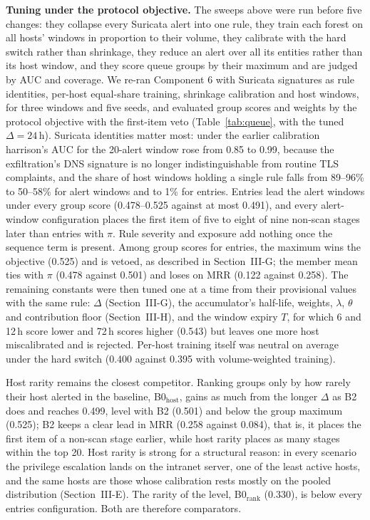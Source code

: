 \documentclass[conference]{IEEEtran}
\begin{document}
\textbf{Tuning under the protocol objective.} The sweeps above were run before five changes: they collapse every Suricata alert into one rule, they train each forest on all hosts' windows in proportion to their volume, they calibrate with the hard switch rather than shrinkage, they reduce an alert over all its entities rather than its host window, and they score queue groups by their maximum and are judged by AUC and coverage. We re-ran Component 6 with Suricata signatures as rule identities, per-host equal-share training, shrinkage calibration and host windows, for three windows and five seeds, and evaluated group scores and weights by the protocol objective with the first-item veto (Table~\ref{tab:queue}, with the tuned $\Delta = 24$\,h). Suricata identities matter most: under the earlier calibration harrison's AUC for the 20-alert window rose from 0.85 to 0.99, because the exfiltration's DNS signature is no longer indistinguishable from routine TLS complaints, and the share of host windows holding a single rule falls from 89--96\% to 50--58\% for alert windows and to 1\% for entries. Entries lead the alert windows under every group score (0.478--0.525 against at most 0.491), and every alert-window configuration places the first item of five to eight of nine non-scan stages later than entries with $\pi$. Rule severity and exposure add nothing once the sequence term is present. Among group scores for entries, the maximum wins the objective (0.525) and is vetoed, as described in Section~III-G; the member mean ties with $\pi$ (0.478 against 0.501) and loses on MRR (0.122 against 0.258). The remaining constants were then tuned one at a time from their provisional values with the same rule: $\Delta$ (Section~III-G), the accumulator's half-life, weights, $\lambda$, $\theta$ and contribution floor (Section~III-H), and the window expiry $T$, for which 6 and 12\,h score lower and 72\,h scores higher (0.543) but leaves one more host miscalibrated and is rejected. Per-host training itself was neutral on average under the hard switch (0.400 against 0.395 with volume-weighted training).

Host rarity remains the closest competitor. Ranking groups only by how rarely their host alerted in the baseline, B0$_\mathrm{host}$, gains as much from the longer $\Delta$ as B2 does and reaches 0.499, level with B2 (0.501) and below the group maximum (0.525); B2 keeps a clear lead in MRR (0.258 against 0.084), that is, it places the first item of a non-scan stage earlier, while host rarity places as many stages within the top 20. Host rarity is strong for a structural reason: in every scenario the privilege escalation lands on the intranet server, one of the least active hosts, and the same hosts are those whose calibration rests mostly on the pooled distribution (Section~III-E). The rarity of the level, B0$_\mathrm{rank}$ (0.330), is below every entries configuration. Both are therefore comparators.
\end{document}
